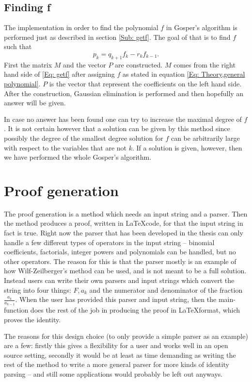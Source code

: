 \subsection{Finding f}
The implementation in order to find the polynomial $f$ in Gosper's algorithm is performed just as described in section \ref{Sub: getf}. The goal of that is to find $f$ such that
\begin{equation}\label{Eq: getf}
  p_k=q_{k+1}f_k-r_kf_{k-1}.
\end{equation}
First the matrix $M$ and the vector $P$ are constructed. $M$ comes from the right hand side of \ref{Eq: getf} after assigning $f$ as stated in equation \ref{Eq: Theory,general polynomial}. $P$ is the vector that represent the coefficients on the left hand side. After the construction, Gaussian elimination is performed and then hopefully an answer will be given.

In case no answer has been found one can try to increase the maximal degree of $f$. It is not certain however that a solution can be given by this method since possibly the degree of the smallest degree solution for $f$ can be arbitrarily large with respect to the variables that are not $k$. If a solution is given, however, then we have performed the whole Gosper's algorithm.

\section{Proof generation}
The proof generation is a method which needs an input string and a parser. Then the method produces a proof, written in \LaTeX code, for that the input string in fact is true. Right now the parser that has been developed in the thesis can only handle a few different types of operators in the input string -- binomial coefficients, factorials, integer powers and polynomials can be handled, but no other operators. The reason for this is that the parser mostly is an example of how Wilf-Zeilberger's method can be used, and is not meant to be a full solution. Instead users can write their own parsers and input strings which convert the string into four things: $F,a_k$ and the numerator and denominator of the fraction $\frac{a_k}{a_{k-1}}$. When the user has provided this parser and input string, then the main-function does the rest of the job in producing the proof in \LaTeX format, which proves the identity.

The reasons for this design choice (to only provide a simple parser as an example) are a few: firstly this gives a flexibility for a user and works well in an open source setting, secondly it would be at least as time demanding as writing the rest of the method to write a more general parser for more kinds of identity parsing -- and still some applications would probably be left out anyways.

